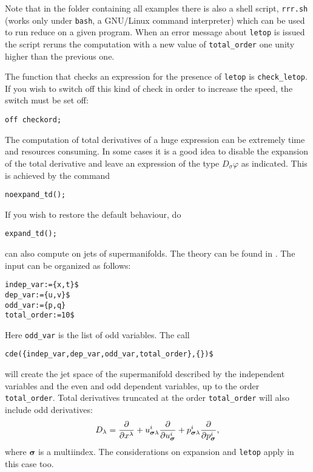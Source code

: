Note that in the folder containing all examples there is also a shell script,
\texttt{rrr.sh} (works only under \texttt{bash}, a GNU/Linux command
interpreter) which can be used to run reduce on a given \cde program.
When an error message about \texttt{letop} is issued the script
reruns the computation with a new value of \texttt{total\_order} one unity
higher than the previous one.

\hypertarget{switch:CHECKORD}{}
The function that checks an expression for the presence of \texttt{letop} is
\texttt{check\_letop}.  If you wish to switch off this kind of check in order
to increase the speed, the switch
 must be set off:
\begin{verbatim}
off checkord;
\end{verbatim}

The computation of total derivatives of a huge expression can be extremely time
and resources consuming. In some cases it is a good idea to disable the
expansion of the total derivative and leave an expression of the type $D_\sigma
\varphi$ as indicated. This is achieved by the command
\begin{verbatim}
noexpand_td();
\end{verbatim}
If you wish to restore the default behaviour, do
\begin{verbatim}
expand_td();
\end{verbatim}

\cde can also compute on jets of supermanifolds. The theory can be found in
\cite{IgoninVerbovetskyVitolo:2004,KerstenKrasilshchikVerboretsky:2004,KrasilshchikVerbovetsky:JGP:2011}. The input can be organized as follows:
\begin{verbatim}
indep_var:={x,t}$
dep_var:={u,v}$
odd_var:={p,q}
total_order:=10$
\end{verbatim}
Here \texttt{odd\_var} is the list of odd variables. The call
\begin{verbatim}
cde({indep_var,dep_var,odd_var,total_order},{})$
\end{verbatim}
will create the jet space of the supermanifold described by the independent
variables and the even and odd dependent variables, up to the order
\texttt{total\_order}. Total derivatives truncated at the order
\texttt{total\_order} will also include odd derivatives:
\begin{equation}
  D_\lambda=\pd{}{x^\lambda} +
  u^i_{\boldsymbol{\sigma}\lambda}\pd{}{u^i_{\boldsymbol{\sigma}}}
    + p^i_{\boldsymbol{\sigma}\lambda}\pd{}{p^i_{\boldsymbol{\sigma}}},
\end{equation}
where $\boldsymbol{\sigma}$ is a multiindex. The considerations on
expansion and \texttt{letop} apply in this case too.

